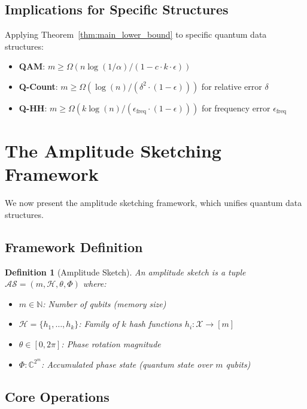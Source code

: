 \documentclass[11pt,letterpaper]{article}
\newtheorem{definition}{Definition}
\begin{document}
\subsection{Implications for Specific Structures}

Applying Theorem~\ref{thm:main_lower_bound} to specific quantum data structures:

\begin{itemize}
\item \textbf{QAM}: $m \geq \Omega(n \log(1/\alpha) / (1 - c \cdot k \cdot \epsilon))$
\item \textbf{Q-Count}: $m \geq \Omega(\log(n) / (\delta^2 \cdot (1-\epsilon)))$ for relative error $\delta$
\item \textbf{Q-HH}: $m \geq \Omega(k \log(n) / (\epsilon_{\text{freq}} \cdot (1-\epsilon)))$ for frequency error $\epsilon_{\text{freq}}$
\end{itemize}

\section{The Amplitude Sketching Framework}
\label{sec:framework}

We now present the amplitude sketching framework, which unifies quantum data structures.

\subsection{Framework Definition}

\begin{definition}[Amplitude Sketch]
An amplitude sketch is a tuple $\mathcal{AS} = (m, \mathcal{H}, \theta, \Phi)$ where:
\begin{itemize}
\item $m \in \mathbb{N}$: Number of qubits (memory size)
\item $\mathcal{H} = \{h_1, \ldots, h_k\}$: Family of $k$ hash functions $h_i : \mathcal{X} \to [m]$
\item $\theta \in [0, 2\pi]$: Phase rotation magnitude
\item $\Phi : \mathbb{C}^{2^m}$: Accumulated phase state (quantum state over $m$ qubits)
\end{itemize}
\end{definition}

\subsection{Core Operations}
\end{document}
